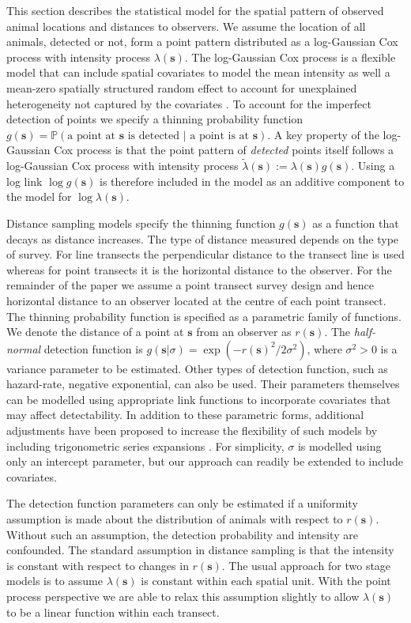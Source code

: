 \documentclass{statsoc}
\newcommand{\bs}{\mathbf{s}}
\newcommand{\tl}{\tilde{\lambda}}   %
\begin{document}
This section describes the statistical model for the spatial pattern of observed animal locations and distances to observers. We assume the location of all animals, detected or not, form a point pattern distributed as a log-Gaussian Cox process with intensity process $\lambda(\bs)$.  The log-Gaussian Cox process is a flexible model that can include spatial covariates to model the mean intensity as well a mean-zero spatially structured random effect to account for unexplained heterogeneity not captured by the covariates \citep{moller_log_1998}.  To account for the imperfect detection of points we specify a thinning probability function $g(\bs) = \mathbb{P}(\text{a point at $\bs$ is detected } |\text{ a point is at $\bs$})$. A key property of the log-Gaussian Cox process is that the point pattern of \textit{detected} points itself follows a log-Gaussian Cox process with intensity process $\tl(\bs) := \lambda(\bs)g(\bs)$.  Using a log link $\log g(\bs)$ is therefore included in the model as an additive component to the model for $\log \lambda(\bs)$.  

Distance sampling models specify the thinning function $g(\bs)$ as a function that decays as distance increases.  The type of distance measured depends on the type of survey.  For line transects the perpendicular distance to the transect line is used whereas for point transects it is the horizontal distance to the observer.  For the remainder of the paper we assume a point transect survey design and hence horizontal distance to an observer located at the centre of each point transect.  The thinning probability function is specified as a parametric family of functions. We denote the distance of a point at $\bs$ from an observer as $r(\bs)$.  The \textit{half-normal} detection function is $g(\bs | \sigma) = \exp(-r(\bs)^2 / 2\sigma^2)$, where $\sigma^2 > 0$ is a variance parameter to be estimated.  Other types of detection function, such as hazard-rate, negative exponential, can also be used. Their parameters themselves can be modelled using appropriate link functions to incorporate covariates that may affect detectability.  In addition to these parametric forms, additional adjustments have been proposed to increase the flexibility of such models by including trigonometric series expansions \citep{buckland_distance_2015}.  For simplicity, $\sigma$ is modelled using only an intercept parameter, but our approach can readily be extended to include covariates.

The detection function parameters can only be estimated if a uniformity assumption is made about the distribution of animals with respect to $r(\bs)$. Without such an assumption, the detection probability and intensity are confounded.  The standard assumption in distance sampling is that the intensity is constant with respect to changes in $r(\bs)$. The usual approach for two stage models is to assume $\lambda(\bs)$ is constant within each spatial unit.  With the point process perspective we are able to relax this assumption slightly to allow $\lambda(\bs)$ to be a linear function within each transect.
\end{document}
